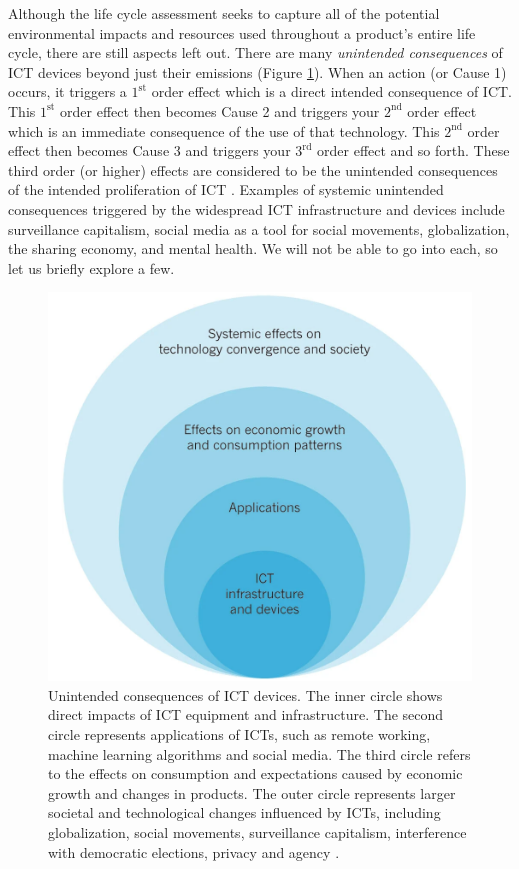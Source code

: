 \documentclass{article}
\begin{document}
Although the life cycle assessment seeks to capture all of the potential environmental impacts and resources used throughout a product's entire life cycle, there are still aspects left out. There are many \textit{unintended consequences} of ICT devices beyond just their emissions (Figure \ref{ICT_unintended_consequences}). When an action (or Cause 1) occurs, it triggers a $1^{\text{st}}$ order effect which is a direct intended consequence of ICT. This $1^{\text{st}}$ order effect then becomes Cause 2 and triggers your $2^{\text{nd}}$ order effect which is an immediate consequence of the use of that technology. This $2^{\text{nd}}$ order effect then becomes Cause 3 and triggers your $3^{\text{rd}}$ order effect and so forth. These third order (or higher) effects are considered to be the unintended consequences of the intended proliferation of ICT \cite{merton1936unanticipated}. Examples of systemic unintended consequences triggered by the widespread ICT infrastructure and devices include surveillance capitalism, social media as a tool for social movements, globalization, the sharing economy, and mental health. We will not be able to go into each, so let us briefly explore a few.

\begin{figure}[h]
    \includegraphics[width=.65 \textwidth]{./images/ICT_unintended_consequences.png}
    \centering
    \caption{Unintended consequences of ICT devices. The inner circle shows direct impacts of ICT equipment and infrastructure. The second circle represents applications of ICTs, such as remote working, machine learning algorithms and social media. The third circle refers to the effects on consumption and expectations caused by economic growth and changes in products. The outer circle represents larger societal and technological changes influenced by ICTs, including globalization, social movements, surveillance capitalism, interference with democratic elections, privacy and agency \cite{williams2011environmental}.}
    \label{ICT_unintended_consequences}
\end{figure}
\end{document}
